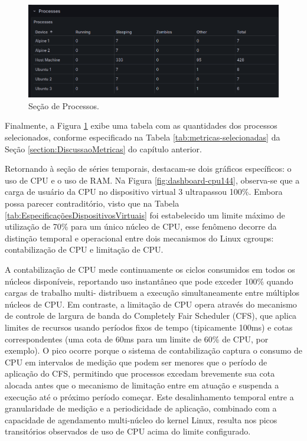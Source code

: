 \begin{figure}[H]
\centering
\setlength{\abovecaptionskip}{-20pt}
\includegraphics[width=\textwidth]{Imagens/chap04/dashboard/processes.png}
\caption{Seção de Processos.}
\label{fig:dashboard-processes}
\end{figure}

Finalmente, a Figura \ref{fig:dashboard-processes} exibe uma tabela com as quantidades dos processos selecionados, conforme especificado na Tabela \ref{tab:metricas-selecionadas} da Seção \ref{section:DiscussaoMetricas} do capítulo anterior.

Retornando à seção de séries temporais, destacam-se dois gráficos específicos: o uso de CPU e o uso de RAM. Na Figura \ref{fig:dashboard-cpu144}, observa-se que a carga de usuário da CPU no dispositivo virtual 3 ultrapassou 100\%. Embora possa parecer contraditório, visto que na Tabela \ref{tab:EspecificaçõesDispositivosVirtuais} foi estabelecido um limite máximo de utilização de 70\% para um único núcleo de CPU, esse fenômeno decorre da distinção temporal e operacional entre dois mecanismos do Linux cgroups: contabilização de CPU e limitação de CPU.

A contabilização de CPU mede continuamente os ciclos consumidos em todos os núcleos disponíveis, reportando uso instantâneo que pode exceder 100\% quando cargas de trabalho multi- distribuem a execução simultaneamente entre múltiplos núcleos de CPU. Em contraste, a limitação de CPU opera através do mecanismo de controle de largura de banda do Completely Fair Scheduler (CFS), que aplica limites de recursos usando períodos fixos de tempo (tipicamente 100ms) e cotas correspondentes (uma cota de 60ms para um limite de 60\% de CPU, por exemplo). O pico ocorre porque o sistema de contabilização captura o consumo de CPU em intervalos de medição que podem ser menores que o período de aplicação do CFS, permitindo que processos excedam brevemente sua cota alocada antes que o mecanismo de limitação entre em atuação e suspenda a execução até o próximo período começar. Este desalinhamento temporal entre a granularidade de medição e a periodicidade de aplicação, combinado com a capacidade de agendamento multi-núcleo do kernel Linux, resulta nos picos transitórios observados de uso de CPU acima do limite configurado.

